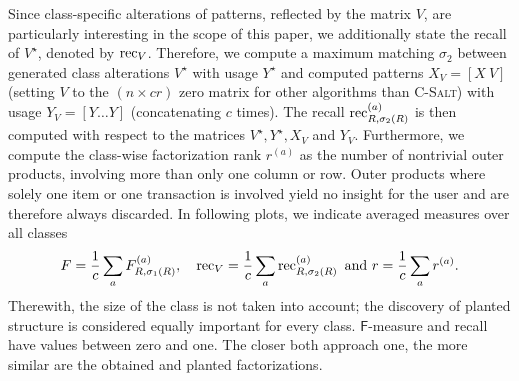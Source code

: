 Since class-specific alterations of patterns, reflected by the matrix $V$, are particularly interesting in the scope of this paper, we additionally state the recall of $V^\star$, denoted by $\operatorname{rec}_V$. Therefore, we compute a maximum matching $\sigma_2$ between generated class alterations $V^\star$ with usage $Y^\star$ and computed patterns $X_V=[X\ V]$ (setting $V$ to the $(n\times cr)$ zero matrix for other algorithms than \textsc{C-Salt}) with usage $Y_V=[Y \ldots Y]$ (concatenating $c$ times). The recall $\operatorname{rec}_{R,\sigma_2(R)}^{(a)}$ is then computed with respect to the matrices $V^\star, Y^\star, X_V$ and $Y_V$.
Furthermore, we compute the class-wise factorization rank $r^{(a)}$ as the number of nontrivial outer products, involving more than only one column or row. Outer products where solely one item or one transaction is involved yield no insight for the user and are therefore always discarded. In following plots, we indicate averaged measures over all classes
\[ F=\frac{1}{c}\sum_a F^{(a)}_{R,\sigma_1(R)}, \quad \operatorname{rec}_V=\frac{1}{c}\sum_a \operatorname{rec}^{(a)}_{R,\sigma_2(R)} \text{ and } r=\frac{1}{c}\sum_a r^{(a)}.
\]
Therewith, the size of the class is not taken into account; the discovery of planted structure is considered equally important for every class.
$\mathsf{F}$-measure and recall have values between zero and one. The closer both approach one, the more similar are the obtained and planted factorizations.


